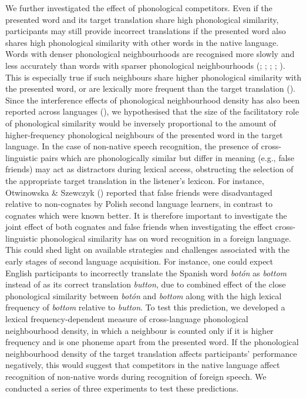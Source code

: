 \documentclass[
]{article}
\begin{document}
We further investigated the effect of phonological competitors. Even if
the presented word and its target translation share high phonological
similarity, participants may still provide incorrect translations if the
presented word also shares high phonological similarity with other words
in the native language. Words with denser phonological neighbourhoods
are recognised more slowly and less accurately than words with sparser
phonological neighbourhoods (; ; ; ;
). This is
especially true if such neighbours share higher phonological similarity
with the presented word, or are lexically more frequent than the target
translation ().
Since the interference effects of phonological neighbourhood density has
also been reported across languages
(), we
hypothesised that the size of the facilitatory role of phonological
similarity would be inversely proportional to the amount of
higher-frequency phonological neighbours of the presented word in the
target language. In the case of non-native speech recognition, the
presence of cross-linguistic pairs which are phonologically similar but
differ in meaning (e.g., false friends) may act as distractors during
lexical access, obstructing the selection of the appropriate target
translation in the listener's lexicon. For instance, Otwinowska \&
Szewczyk () reported that false
friends were disadvantaged relative to non-cognates by Polish second
language learners, in contrast to cognates which were known better. It
is therefore important to investigate the joint effect of both cognates
and false friends when investigating the effect cross-linguistic
phonological similarity has on word recognition in a foreign language.
This could shed light on available strategies and challenges associated
with the early stages of second language acquisition. For instance, one
could expect English participants to incorrectly translate the Spanish
word \emph{botón} as \emph{bottom} instead of as its correct translation
\emph{button}, due to combined effect of the close phonological
similarity between \emph{botón} and \emph{bottom} along with the high
lexical frequency of \emph{bottom} relative to \emph{button}. To test
this prediction, we developed a lexical frequency-dependent measure of
cross-language phonological neighbourhood density, in which a neighbour
is counted only if it is higher frequency and is one phoneme apart from
the presented word. If the phonological neighbourhood density of the
target translation affects participants' performance negatively, this
would suggest that competitors in the native language affect recognition
of non-native words during recognition of foreign speech. We conducted a
series of three experiments to test these predictions.
\end{document}
